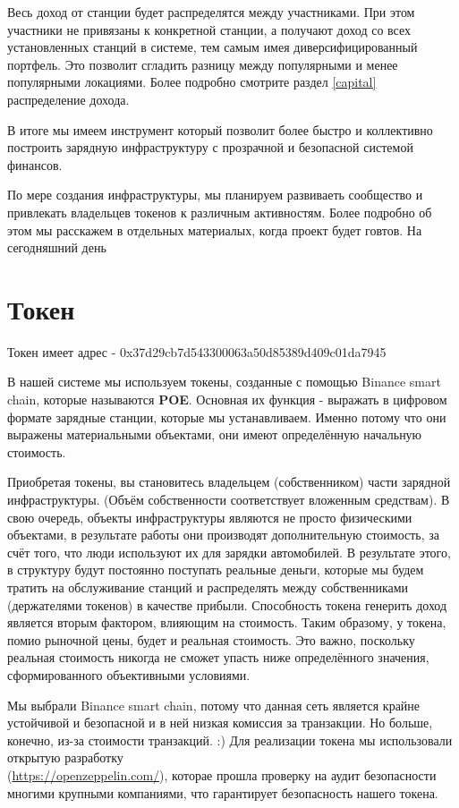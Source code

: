 \documentclass[a4paper,12pt]{report}
\newcommand{\contractAddress}{0x37d29cb7d543300063a50d85389d409c01da7945}
\begin{document}
 
Весь доход от станции будет распределятся между участниками. При этом участники не привязаны к конкретной станции, а получают доход со всех установленных станций в системе, тем самым имея диверсифицированный портфель. Это позволит сгладить разницу между популярными и менее популярными локациями. 
Более подробно смотрите раздел \ref{capital} распределение дохода.

В итоге мы имеем инструмент который позволит более быстро и коллективно построить зарядную инфраструктуру с прозрачной и безопасной системой финансов.

По мере создания инфраструктуры, мы планируем развиваеть сообщество и привлекать владельцев токенов к различным активностям. Более подробно об этом мы расскажем в отдельных материалых, когда проект будет говтов. На сегодняшний день 

\section{Токен}

Токен имеет адрес - \contractAddress 

В нашей системе мы используем токены, созданные с помощью Binance smart chain, которые называются \textbf{POE}. Основная их функция - выражать в цифровом формате зарядные станции, которые мы устанавливаем. Именно потому что они выражены материальными объектами, они имеют определённую начальную стоимость.

Приобретая токены, вы становитесь владельцем (собственником) части зарядной инфраструктуры. (Объём собственности соответствует вложенным средствам). В свою очередь, объекты инфраструктуры являются не просто физическими объектами, в результате работы они производят дополнительную стоимость, за счёт того, что люди используют их для зарядки автомобилей. В результате этого, в структуру будут постоянно поступать реальные деньги, которые мы будем тратить на обслуживание станций и распределять между собственниками (держателями токенов) в качестве прибыли. Способность токена генерить доход является вторым фактором, влияющим на стоимость. Таким образому, у токена, помио рыночной цены, будет и реальная стоимость. Это важно, поскольку реальная стоимость никогда не сможет упасть ниже определённого значения, сформированного объективными условиями. 

Мы выбрали Binance smart chain, потому что данная сеть является крайне устойчивой и безопасной и в ней низкая комиссия за транзакции. Но больше, конечно, из-за стоимости транзакций. :)
Для реализации токена мы использовали открытую разработку \\ (\href{https://openzeppelin.com/}{https://openzeppelin.com/}), которае прошла проверку на аудит безопасности многими крупными компаниями, что гарантирует безопасность нашего токена.
\end{document}
